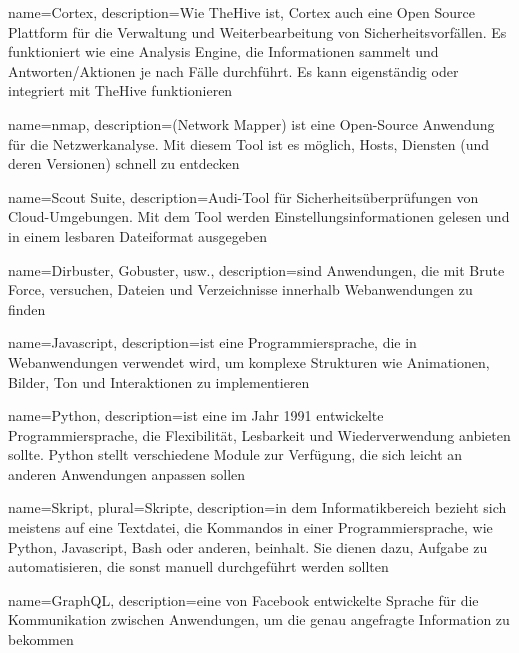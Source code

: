  {
    name={Cortex},
    description={Wie \gls{TheHive} ist, Cortex auch eine Open Source Plattform für die Verwaltung und Weiterbearbeitung von Sicherheitsvorfällen. Es funktioniert wie eine Analysis Engine, die Informationen sammelt und Antworten/Aktionen je nach Fälle durchführt. Es kann eigenständig oder integriert mit TheHive funktionieren \citep{TheHive}}   
}

 {
    name={nmap},
    description={(Network Mapper) ist eine Open-Source Anwendung für die Netzwerkanalyse. Mit diesem Tool ist es möglich, Hosts, Diensten (und deren Versionen) schnell
    zu entdecken \citep{nmap}}    
}

 {
    name={Scout Suite},
    description={Audi-Tool für Sicherheitsüberprüfungen von Cloud-Umgebungen. Mit dem Tool werden Einstellungsinformationen gelesen und in einem lesbaren Dateiformat ausgegeben \citep{scoutsuite}}   
}

 {
    name={Dirbuster, Gobuster, usw.},
    description={sind Anwendungen, die mit Brute Force, versuchen, Dateien und Verzeichnisse innerhalb Webanwendungen zu finden \citep{kalitools}}   
}

 {
    name={Javascript},
    description={ist eine Programmiersprache, die in Webanwendungen verwendet wird, um komplexe Strukturen wie Animationen, Bilder, Ton und Interaktionen zu implementieren \citep{javascriptdefinition}}   
}

 {
    name={Python},
    description={ist eine im Jahr 1991 entwickelte Programmiersprache, die Flexibilität, Lesbarkeit und Wiederverwendung anbieten sollte. Python stellt verschiedene Module zur Verfügung, die sich leicht an anderen Anwendungen anpassen sollen \citep{python}}   
}

 {
    name={Skript},
    plural={Skripte},
    description={in dem Informatikbereich bezieht sich meistens auf eine Textdatei, die Kommandos in einer Programmiersprache, wie Python, Javascript, Bash oder anderen, beinhalt. Sie dienen dazu, Aufgabe zu automatisieren, die sonst manuell durchgeführt werden sollten \citep{skript}}   
}

 {
    name={GraphQL},
    description={eine von Facebook entwickelte Sprache für die Kommunikation zwischen Anwendungen, um die genau angefragte Information zu bekommen \citep{GraphQL}}   
}


